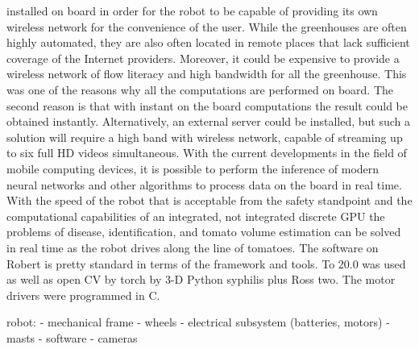 \begin{description}
installed on board in order for the robot to be capable of providing its own wireless network for the convenience of the user. While the greenhouses are often highly automated, they are also often located in remote places that lack sufficient coverage of the Internet providers. Moreover, it could be expensive to provide a wireless network of flow literacy and high bandwidth for all the greenhouse. This was one of the reasons why all the computations are performed on board. The second reason is that with instant on the board computations the result could be obtained instantly. Alternatively, an external server could be installed, but such a solution will require a high band with wireless network, capable of streaming up to six full HD videos simultaneous. With the current developments in the field of mobile computing devices, it is possible to perform the inference of modern neural networks and other algorithms to process data on the board in real time. With the speed of the robot that is acceptable from the safety standpoint and the computational capabilities of an integrated, not integrated discrete GPU the problems of disease, identification, and tomato volume estimation can be solved in real time as the robot drives along the line of tomatoes. The software on Robert is pretty standard in terms of the framework and tools. To 20.0 was used as well as open CV by torch by 3-D Python syphilis plus Ross two. The motor drivers were programmed in C.

robot:
- mechanical frame
- wheels
- electrical subsystem (batteries, motors)
- masts
- software
- cameras



\end{description}

